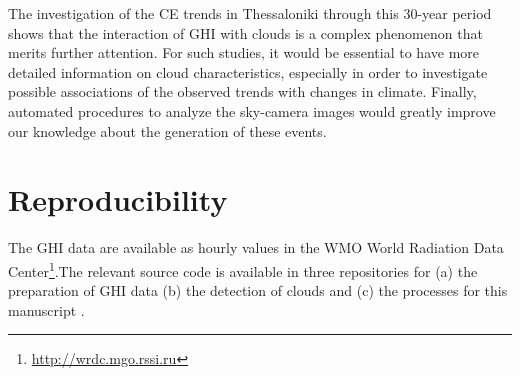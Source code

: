 \documentclass[preprint, 5p,
authoryear]{elsarticle} %
\begin{document}
The investigation of the CE trends in Thessaloniki through this 30-year
period shows that the interaction of GHI with clouds is a complex
phenomenon that merits further attention. For such studies, it would be
essential to have more detailed information on cloud characteristics,
especially in order to investigate possible associations of the observed
trends with changes in climate. Finally, automated procedures to analyze
the sky-camera images would greatly improve our knowledge about the
generation of these events.

\hypertarget{reproducibility}{%
\section*{Reproducibility}\label{reproducibility}}

The GHI data are available as hourly values in the WMO World Radiation
Data Center\footnote{\url{http://wrdc.mgo.rssi.ru}}.The relevant source
code is available in three repositories for (a) the preparation of GHI
data \citep{natsis_2024_13744467} (b) the detection of clouds
\citep{thanasis_n_2024_13744460} and (c) the processes for this
manuscript \citep{thanasis_n_2024_13744472}.


\end{document}

